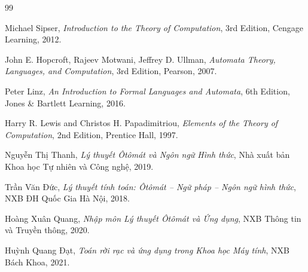 \documentclass[12pt,a4paper]{report}
\begin{document}
\begin{thebibliography}{99}

Michael Sipser, \textit{Introduction to the Theory of Computation}, 3rd Edition, Cengage Learning, 2012.

John E. Hopcroft, Rajeev Motwani, Jeffrey D. Ullman,
\textit{Automata Theory, Languages, and Computation}, 3rd Edition, Pearson, 2007.

Peter Linz, \textit{An Introduction to Formal Languages and Automata}, 6th Edition, Jones \& Bartlett Learning, 2016.

Harry R. Lewis and Christos H. Papadimitriou,
\textit{Elements of the Theory of Computation}, 2nd Edition, Prentice Hall, 1997.

Nguyễn Thị Thanh, \textit{Lý thuyết Ôtômát và Ngôn ngữ Hình thức}, Nhà xuất bản Khoa học Tự nhiên và Công nghệ, 2019.

Trần Văn Đức, \textit{Lý thuyết tính toán: Ôtômát – Ngữ pháp – Ngôn ngữ hình thức}, NXB ĐH Quốc Gia Hà Nội, 2018.

Hoàng Xuân Quang, \textit{Nhập môn Lý thuyết Ôtômát và Ứng dụng}, NXB Thông tin và Truyền thông, 2020.

Huỳnh Quang Đạt, \textit{Toán rời rạc và ứng dụng trong Khoa học Máy tính}, NXB Bách Khoa, 2021.

\end{thebibliography}
\end{document}
